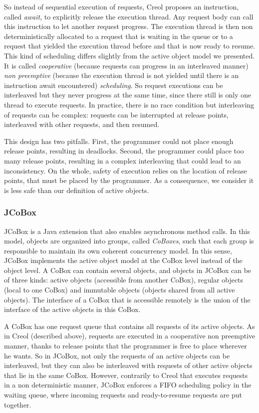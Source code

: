 \documentclass[11pt]{report}
\begin{document}
So instead of sequential execution of requests, Creol proposes an instruction, called \emph{await}, to explicitly release the execution thread. Any request body can call this instruction to let another request progress.
The execution thread is then non deterministically allocated to a request that is waiting in the queue or to a request that yielded the execution thread before and that is now ready to resume.
This kind of scheduling differs slightly from the active object model we presented. It is called \emph{cooperative} (because requests can progress in an interleaved manner) \emph{non preemptive} (because the execution thread is not yielded until there is an instruction await encountered) \emph{scheduling}. 
So request executions can be interleaved but they never progress at the same time, since there still is only one thread to execute requests. In practice, there is no race condition but interleaving of requests can be complex: requests can be interrupted at release points, interleaved with other requests, and then resumed.

This design has two pitfalls. First, the programmer could not place enough release points, resulting in deadlocks. Second, the programmer could place too many release points, resulting in a complex interleaving that could lead to an inconsistency. On the whole, safety of execution relies on the location of release points, that must be placed by the programmer. As a consequence, we consider it is less safe than our definition of active objects.


\subsubsection{JCoBox}\label{sec:JCoBox}
JCoBox \cite{ref:jcobox} is a Java extension that also enables asynchronous method calls. In this model, objects are organized into groups, called \emph{CoBoxes}, such that each group is responsible to maintain its own coherent concurrency model. In this sense, JCoBox implements the active object model at the CoBox level instead of the object level. A CoBox can contain several objects, and objects in JCoBox can be of three kinds: active objects (accessible from another CoBox), regular objects (local to one CoBox) and immutable objects (objects shared from all active objects). 
The interface of a CoBox that is accessible remotely is the union of the interface of the active objects in this CoBox. 

A CoBox has one request queue that contains all requests of its active objects. As in Creol (described above), requests are executed in a cooperative non preemptive manner, thanks to release points that the programmer is free to place wherever he wants.
So in JCoBox, not only the requests of an active objects can be interleaved, but they can also be interleaved with requests of other active objects that lie in the same CoBox. 
However, contrarily to Creol that executes requests in a non deterministic manner, JCoBox enforces a FIFO scheduling policy in the waiting queue, where incoming requests and ready-to-resume requests are put together. 
\end{document}
